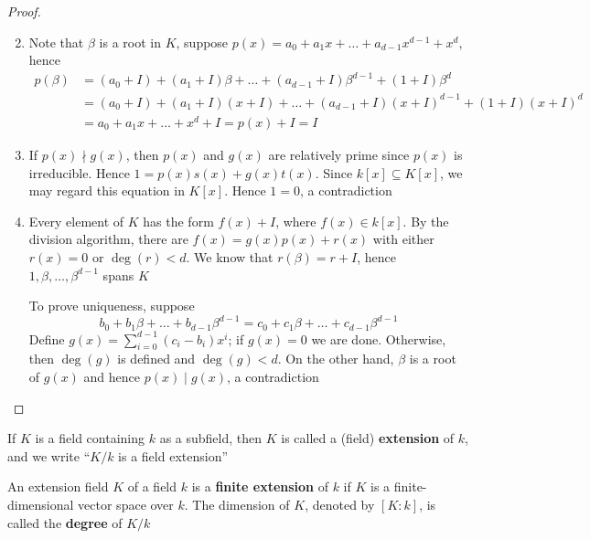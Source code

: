 \documentclass[11pt]{article}
\begin{document}
\begin{proof}
\begin{enumerate}
\setcounter{enumi}{1}
\item Note that \(\beta\) is a root in \(K\), suppose 
\(p(x)=a_0+a_1x+\dots+a_{d-1}x^{d-1}+x^d\), hence
\begin{align*}
p(\beta)&=(a_0+I)+(a_1+I)\beta+\dots+(a_{d-1}+I)\beta^{d-1}+(1+I)\beta^{d}\\
&=(a_0+I)+(a_1+I)(x+I)+\dots+(a_{d-1}+I)(x+I)^{d-1}+(1+I)(x+I)^d\\
&=a_0+a_1x+\dots+x^d+I=p(x)+I=I
\end{align*}
\item If \(p(x)\nmid g(x)\), then \(p(x)\) and \(g(x)\) are relatively prime
since \(p(x)\) is irreducible. Hence \(1=p(x)s(x)+g(x)t(x)\). Since 
\(k[x]\subseteq K[x]\), we may regard this equation in \(K[x]\). Hence
\(1=0\), a contradiction
\setcounter{enumi}{4}
\item Every element of \(K\) has the form \(f(x)+I\), where \(f(x)\in k[x]\).
By the division algorithm, there are \(f(x)=g(x)p(x)+r(x)\) with either 
\(r(x)=0\) or \(\deg(r)< d\). We know that \(r(\beta)=r+I\), hence 
\(1,\beta,\dots,\beta^{d-1}\) spans \(K\)

To prove uniqueness, suppose
\begin{equation*}
b_0+b_1\beta+\dots+b_{d-1}\beta^{d-1}=c_0+c_1\beta+\dots+c_{d-1}\beta^{d-1}
\end{equation*}
Define \(g(x)=\sum_{i=0}^{d-1}(c_i-b_i)x^i\); if \(g(x)=0\) we are done.
Otherwise, then \(\deg(g)\) is defined and \(\deg(g)<d\). On the other
hand, \(\beta\) is a root of \(g(x)\) and hence \(p(x)\mid g(x)\), a contradiction
\end{enumerate}
\end{proof}

\begin{definition}[]
If \(K\) is a field containing \(k\) as a subfield, then \(K\) is called a (field) 
\textbf{extension} of \(k\), and we write ``\(K/k\) is a field extension''

An extension field \(K\) of a field \(k\) is a \textbf{finite extension} of \(k\) if \(K\) is
a finite-dimensional vector space over \(k\). The dimension of \(K\), denoted by
\([K:k]\), is called the \textbf{degree} of \(K/k\)
\end{definition}
\end{document}
